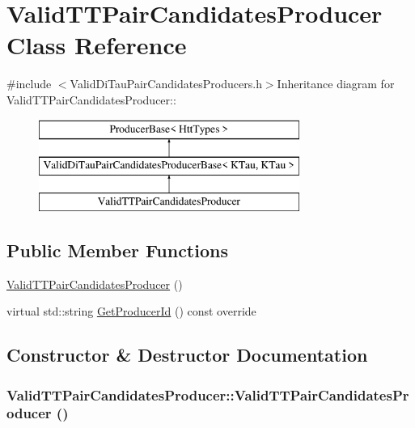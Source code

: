 \hypertarget{classValidTTPairCandidatesProducer}{
\section{ValidTTPairCandidatesProducer Class Reference}
\label{classValidTTPairCandidatesProducer}
}


{\ttfamily \#include $<$ValidDiTauPairCandidatesProducers.h$>$}Inheritance diagram for ValidTTPairCandidatesProducer::\begin{figure}[H]
\begin{center}
\leavevmode
\includegraphics[height=3cm]{classValidTTPairCandidatesProducer}
\end{center}
\end{figure}
\subsection*{Public Member Functions}
\begin{DoxyCompactItemize}
\item 
\hyperlink{classValidTTPairCandidatesProducer_a4b930a560ca18b2fd825b8595dd97c69}{ValidTTPairCandidatesProducer} ()
\item 
virtual std::string \hyperlink{classValidTTPairCandidatesProducer_ada2da9b284f291b868756ad5ab194daf}{GetProducerId} () const override
\end{DoxyCompactItemize}


\subsection{Constructor \& Destructor Documentation}
\hypertarget{classValidTTPairCandidatesProducer_a4b930a560ca18b2fd825b8595dd97c69}{
\subsubsection[{ValidTTPairCandidatesProducer}]{\setlength{\rightskip}{0pt plus 5cm}ValidTTPairCandidatesProducer::ValidTTPairCandidatesProducer ()}}
\label{classValidTTPairCandidatesProducer_a4b930a560ca18b2fd825b8595dd97c69}


